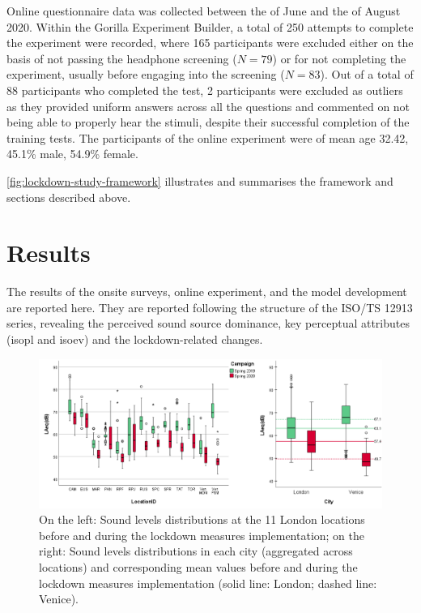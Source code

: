    Online questionnaire data was collected between the  of June and the  of August 2020. Within the Gorilla Experiment Builder, a total of 250 attempts to complete the experiment were recorded, where 165 participants were excluded either on the basis of not passing the headphone screening ($N=79$) or for not completing the experiment, usually before engaging into the screening ($N=83$). Out of a total of 88 participants who completed the test, 2 participants were excluded as outliers as they provided uniform answers across all the questions and commented on not being able to properly hear the stimuli, despite their successful completion of the training tests. The participants of the online experiment were of mean age 32.42, 45.1\% male, 54.9\% female.

   \cref{fig:lockdown-study-framework} illustrates and summarises the framework and sections described above.

\section{Results}

 The results of the onsite surveys, online experiment, and the model development are reported here. They are reported following the structure of the ISO/TS 12913 series, revealing the perceived sound source dominance, key perceptual attributes (\gls{isopl} and \gls{isoev}) and the lockdown-related changes.


\begin{figure}[h]
  \centering
  \includegraphics[width=\textwidth]{Figures/LockdownLAeqCombined.png}
  \caption{On the left: Sound levels distributions at the 11 London locations before and during the lockdown measures implementation; on the right: Sound levels distributions in each city (aggregated across locations) and corresponding mean values before and during the lockdown measures implementation (solid line: London; dashed line: Venice). \label{fig:NsMapLockLAeq}}
\end{figure}

